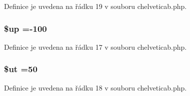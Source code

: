 Definice je uvedena na řádku 19 v souboru chelveticab.\-php.

\hypertarget{chelveticab_8php_a6b5ad2ac55f9df46e8f34e78fbd6f176}{
\subsubsection[{\$up}]{\setlength{\rightskip}{0pt plus 5cm}\$up =-\/100}}\label{chelveticab_8php_a6b5ad2ac55f9df46e8f34e78fbd6f176}


Definice je uvedena na řádku 17 v souboru chelveticab.\-php.

\hypertarget{chelveticab_8php_aadd3f841051043ee58e587e840e8dd0b}{
\subsubsection[{\$ut}]{\setlength{\rightskip}{0pt plus 5cm}\$ut =50}}\label{chelveticab_8php_aadd3f841051043ee58e587e840e8dd0b}


Definice je uvedena na řádku 18 v souboru chelveticab.\-php.

